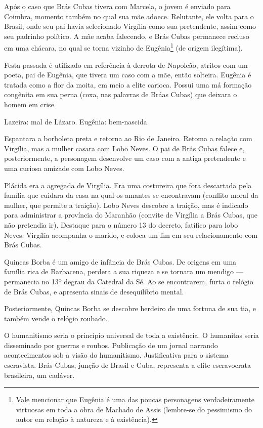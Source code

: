 Após o caso que Brás Cubas tivera com Marcela, o jovem é enviado para Coimbra, momento também no qual sua mãe adoece. Relutante, ele volta para o Brasil, onde seu pai havia selecionado Virgília como sua pretendente, assim como seu padrinho político. A mãe acaba falecendo, e Brás Cubas permanece recluso em uma chácara, no qual se torna vizinho de Eugênia\footnote{Vale mencionar que Eugênia é uma das poucas personagens verdadeiramente virtuosas em toda a obra de Machado de Assis (lembre-se do pessimismo do autor em relação à natureza e à existência).} (de origem ilegítima).

Festa passada é utilizado em referência à derrota de Napoleão; atritos com um poeta, pai de Eugênia, que tivera um caso com a mãe, então solteira. Eugênia é tratada como a flor da moita, em meio a elite carioca. Possui uma má formação congênita em sua perna (coxa, nas palavras de Bráas Cubas) que deixara o homem em crise.

Lazeira: mal de Lázaro. Eugênia: bem-nascida

Espantara a borboleta preta e retorna ao Rio de Janeiro. Retoma a relação com Virgília, mas a mulher casara com Lobo Neves. O pai de Brás Cubas falece e, posteriormente, a personagem desenvolve um caso com a antiga pretendente e uma curiosa amizade com Lobo Neves.

Plácida era a agregada de Virgília. Era uma costureira que fora descartada pela família que cuidara da casa na qual os amantes se encontravam (conflito moral da mulher, que permite a traição). Lobo Neves descobre a traição, mas é indicado para administrar a província do Maranhão (convite de Virgília a Brás Cubas, que não pretendia ir). Destaque para o número 13 do decreto, fatífico para lobo Neves. Virgília acompanha o marido, e coloca um fim em seu relacionamento com Brás Cubas.

Quincas Borba é um amigo de infância de Brás Cubas. De origens em uma família rica de Barbacena, perdera a sua riqueza e se tornara um mendigo — permanecia no 13º degrau da Catedral da Sé. Ao se encontrarem, furta o relógio de Brás Cubas, e apresenta sinais de desequilíbrio mental.

Posteriormente, Quincas Borba se descobre herdeiro de uma fortuna de sua tia, e também vende o relógio roubado.

O humanitismo seria o princípio universal de toda a existência. O humanitas seria disseminado por guerras e roubos. Publicação de um jornal narrando acontecimentos sob a visão do humanitismo. Justificativa para o sistema escravista. Brás Cubas, junção de Brasil e Cuba, representa a elite escravocrata brasileira, um cadáver.

